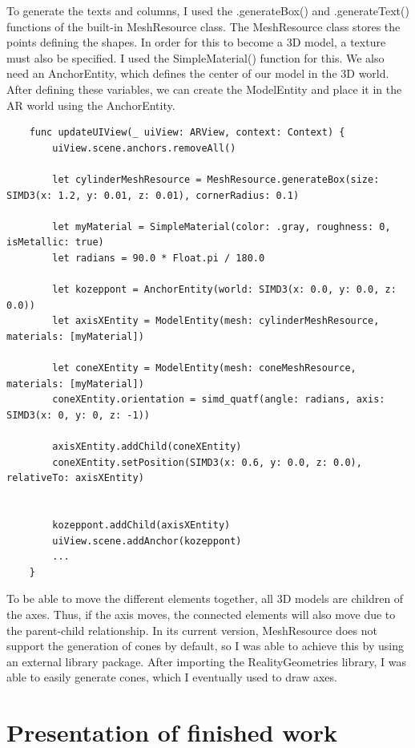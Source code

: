 \documentclass[11pt,a4paper,oneside]{report}
\begin{document}
To generate the texts and columns, I used the .generateBox() and .generateText() functions of the built-in MeshResource class.
The MeshResource class stores the points defining the shapes. In order for this to become a 3D model, a texture must also be specified. I used the SimpleMaterial() function for this.
We also need an AnchorEntity, which defines the center of our model in the 3D world.
After defining these variables, we can create the ModelEntity and place it in the AR world using the AnchorEntity.

\begin{lstlisting}
    func updateUIView(_ uiView: ARView, context: Context) {
        uiView.scene.anchors.removeAll()
        
        let cylinderMeshResource = MeshResource.generateBox(size: SIMD3(x: 1.2, y: 0.01, z: 0.01), cornerRadius: 0.1)
        
        let myMaterial = SimpleMaterial(color: .gray, roughness: 0, isMetallic: true)
        let radians = 90.0 * Float.pi / 180.0
            
        let kozeppont = AnchorEntity(world: SIMD3(x: 0.0, y: 0.0, z: 0.0))
        let axisXEntity = ModelEntity(mesh: cylinderMeshResource, materials: [myMaterial])
        
        let coneXEntity = ModelEntity(mesh: coneMeshResource, materials: [myMaterial])
        coneXEntity.orientation = simd_quatf(angle: radians, axis: SIMD3(x: 0, y: 0, z: -1))
        
        axisXEntity.addChild(coneXEntity)
        coneXEntity.setPosition(SIMD3(x: 0.6, y: 0.0, z: 0.0), relativeTo: axisXEntity)
        
        
        kozeppont.addChild(axisXEntity)
        uiView.scene.addAnchor(kozeppont)
        ...
    }
\end{lstlisting}

To be able to move the different elements together, all 3D models are children of the axes. Thus, if the axis moves, the connected elements will also move due to the parent-child relationship. In its current version, MeshResource does not support the generation of cones by default, so I was able to achieve this by using an external library package. After importing the RealityGeometries library, I was able to easily generate cones, which I eventually used to draw axes.

\chapter{Presentation of finished work}
\end{document}
